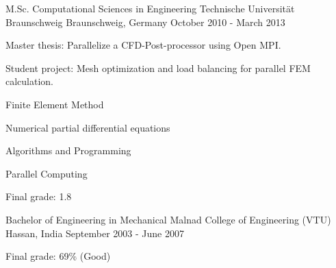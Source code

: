 \begin{cventries}
  \cventry
    {M.Sc. Computational Sciences in Engineering}
    {Technische Universität Braunschweig}
    {Braunschweig, Germany}
    {October 2010 - March 2013}
    {
      \begin{cvitems}
        \item {Master thesis: Parallelize a CFD-Post-processor using Open MPI.}
        \item {Student project: Mesh optimization and load balancing for parallel FEM calculation.}
        \item {Finite Element Method}
        \item {Numerical partial differential equations}
        \item {Algorithms and Programming}
        \item {Parallel Computing}
        \item {Final grade: 1.8}
      \end{cvitems}
    }

    \cventry
    {Bachelor of Engineering in Mechanical}
    {Malnad College of Engineering (VTU)}
    {Hassan, India}
    {September 2003 - June 2007}
    {
      \begin{cvitems}
        \item {Final grade: 69\% (Good)}
      \end{cvitems}
    }
    
\end{cventries}
